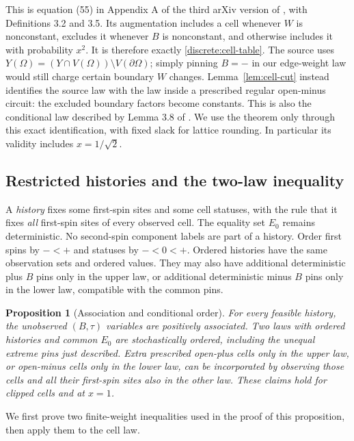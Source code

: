 \documentclass[11pt]{article}
\newtheorem{proposition}[theorem]{Proposition}
\theoremstyle{definition}
\theoremstyle{remark}
\numberwithin{equation}{section}
\begin{document}
This is equation (55) in Appendix A of the third arXiv version of
\cite{GL2025}, with Definitions 3.2 and 3.5. Its augmentation includes a
cell whenever $W$ is nonconstant, excludes it whenever $B$ is nonconstant,
and otherwise includes it with probability $x^2$. It is therefore exactly
\eqref{discrete:cell-table}. The source uses
$Y(\Omega)=(Y\cap V(\Omega))\setminus V(\partial\Omega)$; simply pinning
$B=-$ in our edge-weight law would still charge certain boundary $W$
changes. Lemma~\ref{lem:cell-cut} instead identifies the source law with
the law inside a prescribed regular open-minus circuit: the excluded
boundary factors become constants. This is also the conditional law
described by Lemma 3.8 of \cite{GL2025}. We use the theorem only through
this exact identification, with fixed slack for lattice rounding. In
particular its validity includes $x=1/\sqrt2$.

\subsection{Restricted histories and the two-law inequality}

A \emph{history} fixes some first-spin sites and some cell statuses, with
the rule that it fixes \emph{all} first-spin sites of every observed cell.
The equality set $E_0$ remains deterministic. No second-spin component
labels are part of a history. Order first spins by $-<+$ and statuses by
$-<0<+$. Ordered histories have the same observation sets and ordered
values. They may also have additional deterministic plus $B$ pins only in
the upper law, or additional deterministic minus $B$ pins only in the
lower law, compatible with the common pins.

\begin{proposition}[Association and conditional order]\label{prop:history-order}
For every feasible history, the unobserved $(B,\tau)$ variables are
positively associated. Two laws with ordered histories and common $E_0$
are stochastically ordered, including the unequal extreme pins just
described. Extra prescribed open-plus cells only in the upper law, or
open-minus cells only in the lower law, can be incorporated by observing
those cells and all their first-spin sites also in the other law. These
claims hold for clipped cells and at $x=1$.
\end{proposition}

We first prove two finite-weight inequalities used in the proof of this
proposition, then apply them to the cell law.
\end{document}
